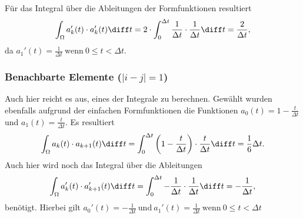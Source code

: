 Für das Integral über die Ableitungen der Formfunktionen resultiert
\begin{equation}
    \int_\Omega a_k'(t) \cdot a_k'(t) \diff t = 2 \cdot \int_{0}^{\Delta t} \frac{1}{\Delta t} \cdot \frac{1}{\Delta t} \diff t = \frac{2}{\Delta t},
\end{equation}
da $a_1'(t)= \frac{1}{\Delta t} \ \text{wenn} \ 0 \leq t < \Delta t$.

\subsubsection{Benachbarte Elemente ($|i - j| = 1$)}
Auch hier reicht es aus, eines der Integrale zu berechnen. 
Gewählt wurden ebenfalls aufgrund der einfachen Formfunktionen die Funktionen $a_0(t) = 1 - \frac{t}{\Delta t}$ und $a_1(t) = \frac{t}{\Delta t}$.
Es resultiert
\begin{equation}
    \int_\Omega a_k(t) \cdot a_{k+1}(t) \diff t = \int_{0}^{\Delta t} \left(1 - \frac{t}{\Delta t}\right) \cdot \frac{t}{\Delta t} \diff t = \frac{1}{6} \Delta t.
\end{equation}
Auch hier wird noch das Integral über die Ableitungen 
\begin{equation}
    \int_\Omega a_k'(t) \cdot a_{k+1}'(t) \diff t = \int_{0}^{\Delta t} -\frac{1}{\Delta t} \cdot \frac{1}{\Delta t} \diff t = -\frac{1}{\Delta t},
\end{equation}
benötigt.
Hierbei gilt $a_0'(t)= -\frac{1}{\Delta t} \ \text{und} \ a_1'(t)= \frac{1}{\Delta t} \ \text{wenn} \ 0 \leq t < \Delta t$


